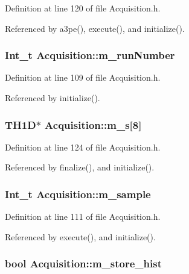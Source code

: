 Definition at line 120 of file Acquisition.h.

Referenced by a3pe(), execute(), and initialize().\hypertarget{classAcquisition_afd35e220e0bfda7e763584524273aeb0}{
\subsubsection[{m\_\-runNumber}]{\setlength{\rightskip}{0pt plus 5cm}Int\_\-t {\bf Acquisition::m\_\-runNumber}}}
\label{classAcquisition_afd35e220e0bfda7e763584524273aeb0}


Definition at line 109 of file Acquisition.h.

Referenced by initialize().\hypertarget{classAcquisition_a15d71455f658e21a12ef4c153c21df65}{
\subsubsection[{m\_\-s}]{\setlength{\rightskip}{0pt plus 5cm}TH1D$\ast$ {\bf Acquisition::m\_\-s}\mbox{[}8\mbox{]}}}
\label{classAcquisition_a15d71455f658e21a12ef4c153c21df65}


Definition at line 124 of file Acquisition.h.

Referenced by finalize(), and initialize().\hypertarget{classAcquisition_a154e5423720ab1f2c4ab5cd125cb4e80}{
\subsubsection[{m\_\-sample}]{\setlength{\rightskip}{0pt plus 5cm}Int\_\-t {\bf Acquisition::m\_\-sample}}}
\label{classAcquisition_a154e5423720ab1f2c4ab5cd125cb4e80}


Definition at line 111 of file Acquisition.h.

Referenced by execute(), and initialize().\hypertarget{classAcquisition_a08f70edd83751dbdab4c8190dc4b9188}{
\subsubsection[{m\_\-store\_\-hist}]{\setlength{\rightskip}{0pt plus 5cm}bool {\bf Acquisition::m\_\-store\_\-hist}}}
\label{classAcquisition_a08f70edd83751dbdab4c8190dc4b9188}


